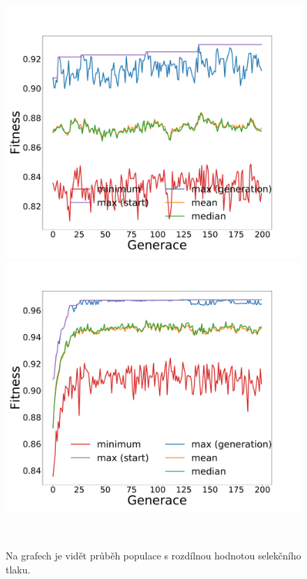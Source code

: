 \documentclass[11pt]{article}
\begin{document}
\begin{figure}
	\centering
    \begin{minipage}[c]{0.48\textwidth}
        \centering\includegraphics[width=\textwidth]{img/s_big_bad.pdf} 
    \end{minipage}
    \begin{minipage}[c]{0.48\textwidth}
        \centering \includegraphics[width=\textwidth]{img/s_big_better.pdf} 
    \end{minipage}
    \\
   \caption{Na grafech je vidět průběh populace s rozdílnou hodnotou selekčního tlaku.}\label{fig:selrun}
\end{figure} 
\end{document}
